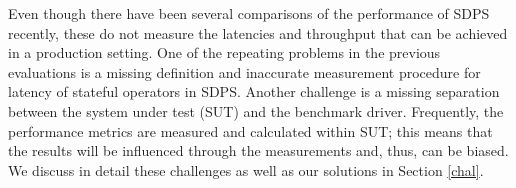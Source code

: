 Even though there have been several comparisons of the performance of SDPS recently, these do not measure the latencies and throughput that can be achieved in a production setting. One of the repeating problems in the previous evaluations is a missing definition and inaccurate measurement procedure for latency of stateful operators in SDPS. Another challenge is a missing separation between the system under test (SUT) and the benchmark driver. Frequently, the performance metrics are measured and calculated within SUT; this means that the results will be influenced through the measurements and, thus, can be biased. %
We discuss in detail these challenges as well as our solutions in Section \ref{chal}.



